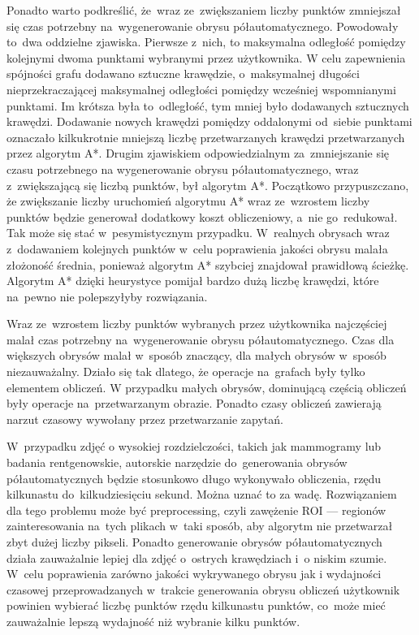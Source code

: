 \documentclass[a4paper,11pt,twoside,openright]{report}
\theoremstyle{definition}
\begin{document}
Ponadto warto podkreślić, że~wraz
ze~zwiększaniem liczby punktów zmniejszał się czas potrzebny na~wygenerowanie
obrysu półautomatycznego. Powodowały to~dwa oddzielne zjawiska. Pierwsze z~nich, to
maksymalna odległość pomiędzy kolejnymi dwoma punktami wybranymi przez użytkownika.
W celu zapewnienia spójności grafu dodawano sztuczne krawędzie, o~maksymalnej długości
nieprzekraczającej maksymalnej odległości pomiędzy wcześniej wspomnianymi punktami.
Im krótsza była to~odległość, tym mniej było dodawanych sztucznych krawędzi.
Dodawanie nowych krawędzi pomiędzy oddalonymi od~siebie punktami oznaczało
kilkukrotnie mniejszą liczbę przetwarzanych krawędzi przetwarzanych przez algorytm
A*. Drugim zjawiskiem odpowiedzialnym za~zmniejszanie się czasu potrzebnego na
wygenerowanie obrysu półautomatycznego, wraz z~zwiększającą się liczbą punktów,
był algorytm A*. Początkowo przypuszczano, że zwiększanie liczby uruchomień algorytmu
A* wraz ze~wzrostem liczby punktów będzie generował dodatkowy koszt obliczeniowy,
a~nie go~redukował. Tak może się stać w~pesymistycznym przypadku. W~realnych
obrysach wraz z~dodawaniem kolejnych punktów w~celu poprawienia jakości obrysu
malała złożoność średnia, ponieważ algorytm A* szybciej znajdował prawidłową
ścieżkę. Algorytm A* dzięki heurystyce pomijał bardzo dużą liczbę krawędzi,
które na~pewno nie polepszyłyby rozwiązania.

Wraz ze~wzrostem liczby punktów wybranych przez użytkownika najczęściej malał
czas potrzebny na~wygenerowanie obrysu półautomatycznego. Czas dla większych
obrysów malał w~sposób znaczący, dla małych obrysów w~sposób niezauważalny.
Działo się tak dlatego, że operacje na~grafach były tylko elementem obliczeń. W
przypadku małych obrysów, dominującą częścią obliczeń były operacje na~przetwarzanym
obrazie. Ponadto czasy obliczeń zawierają narzut czasowy wywołany przez
przetwarzanie zapytań.

W~przypadku zdjęć o wysokiej rozdzielczości, takich jak mammogramy lub badania
rentgenowskie, autorskie narzędzie do~generowania obrysów półautomatycznych
będzie stosunkowo długo wykonywało obliczenia, rzędu kilkunastu do~kilkudziesięciu
sekund. Można uznać to za wadę. Rozwiązaniem dla tego problemu może być
preprocessing, czyli zawężenie ROI --- regionów zainteresowania na~tych plikach
w~taki sposób, aby algorytm nie przetwarzał zbyt dużej liczby pikseli.
Ponadto generowanie obrysów
półautomatycznych działa zauważalnie lepiej dla zdjęć o~ostrych krawędziach i~o
niskim szumie. W~celu poprawienia zarówno jakości wykrywanego obrysu jak i
wydajności czasowej przeprowadzanych w~trakcie generowania obrysu obliczeń użytkownik
powinien wybierać liczbę punktów rzędu kilkunastu punktów, co~może mieć zauważalnie
lepszą wydajność niż wybranie kilku punktów.
\end{document}
